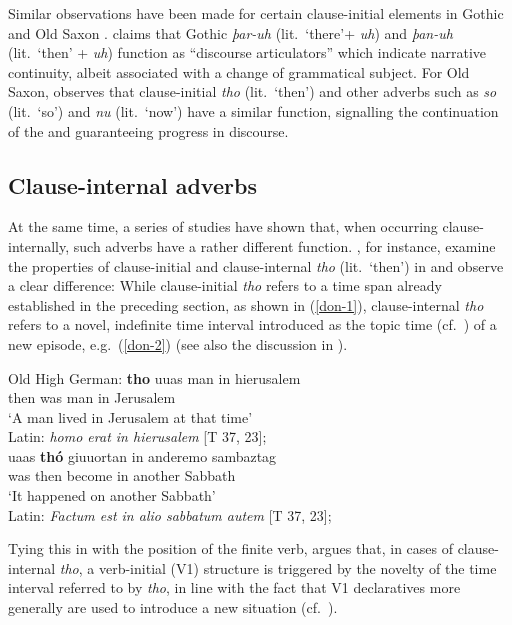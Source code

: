 \documentclass[output=paper,colorlinks,citecolor=brown]{langscibook}
\begin{document}
Similar observations have been made for certain clause-initial elements in Gothic \citep{klein1994gothic} and Old Saxon \citep{linde2009aspects}. \citet{klein1994gothic} claims that Gothic \textit{þar-uh} (lit.~`there'+ \textit{uh}) and \textit{þan-uh} (lit.~`then' + \textit{uh}) function as ``discourse articulators'' which indicate narrative continuity, albeit associated with a change of grammatical subject. For Old Saxon, \citet{linde2009aspects} observes that clause-initial \textit{tho} (lit.~`then') and other adverbs such as \textit{so} (lit.~`so') and \textit{nu} (lit.~`now') have a similar function, signalling the continuation of the  and guaranteeing progress in discourse. 

\subsection{Clause-internal adverbs}
At the same time, a series of studies have shown that, when occurring clause-internally, such adverbs have a rather different function. \citet{donhauser2009rolle}, for instance, examine the properties of clause-initial and clause-internal \textit{tho} (lit.~`then') in  and observe a clear difference: While clause-initial \textit{tho} refers to a time span already established in the preceding section, as shown in (\ref{don-1}), clause-internal \textit{tho} refers to a novel, indefinite time interval introduced as the topic time (cf.~\citealp{klein1994time}) of a new episode, e.g.~(\ref{don-2}) (see also the discussion in \citealp{petrova2011modeling}).

\ea Old High German:
\ea\label{don-1} 
\gll \textbf{tho} uuas man in hierusalem\\
then was man in Jerusalem\\
\glt `A man lived in Jerusalem at that time'\\
Latin: \textit{homo erat in hierusalem} \hfill [T 37, 23]; \citep[219]{petrova2011modeling}\\

\ex\label{don-2}
\gll uaas \textbf{thó} giuuortan in anderemo sambaztag\\
was then become in another Sabbath\\
\glt `It happened on another Sabbath'\\
Latin: \textit{Factum est in alio sabbatum autem} \hfill [T 37, 23]; \citep[219]{petrova2011modeling}
\z 
\z

\noindent Tying this in with the position of the finite verb, \citet[224]{petrova2011modeling} argues that, in cases of clause-internal \textit{tho}, a verb-initial (V1) structure is triggered by the novelty of the time interval referred to by \textit{tho}, in line with the fact that V1 declaratives more generally are used to introduce a new situation (cf.~\citealp{hinterholzl2010v1}).
\end{document}
